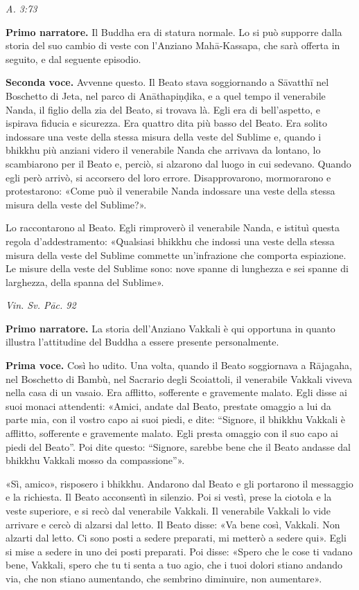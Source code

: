 \emph{A. 3:73}


\textbf{Primo narratore.} Il Buddha era di statura normale. Lo si può supporre
dalla storia del suo cambio di veste con l’Anziano Mahā-Kassapa, che
sarà offerta in seguito, e dal seguente episodio.


\textbf{Seconda voce.} Avvenne questo. Il Beato stava soggiornando a Sāvatthī nel
Boschetto di Jeta, nel parco di Anāthapiṇḍika, e a quel tempo il
venerabile Nanda, il figlio della zia del Beato, si trovava là. Egli era
di bell’aspetto, e ispirava fiducia e sicurezza. Era quattro dita più
basso del Beato. Era solito indossare una veste della stessa misura
della veste del Sublime e, quando i bhikkhu più anziani videro il
venerabile Nanda che arrivava da lontano, lo scambiarono per il Beato e,
perciò, si alzarono dal luogo in cui sedevano. Quando egli però arrivò,
si accorsero del loro errore. Disapprovarono, mormorarono e
protestarono: «Come può il venerabile Nanda indossare una veste della
stessa misura della veste del Sublime?».


Lo raccontarono al Beato. Egli rimproverò il venerabile Nanda, e istituì
questa regola d’addestramento: «Qualsiasi bhikkhu che indossi una veste
della stessa misura della veste del Sublime commette un’infrazione che
comporta espiazione. Le misure della veste del Sublime sono: nove spanne
di lunghezza e sei spanne di larghezza, della spanna del Sublime».


\emph{Vin. Sv. Pāc. 92}


\textbf{Primo narratore.} La storia dell’Anziano Vakkali è qui opportuna in
quanto illustra l’attitudine del Buddha a essere presente personalmente.


\textbf{Prima voce.} Così ho udito. Una volta, quando il Beato soggiornava a
Rājagaha, nel Boschetto di Bambù, nel Sacrario degli Scoiattoli, il
venerabile Vakkali viveva nella casa di un vasaio. Era afflitto,
sofferente e gravemente malato. Egli disse ai suoi monaci attendenti:
«Amici, andate dal Beato, prestate omaggio a lui da parte mia, con il
vostro capo ai suoi piedi, e dite: “Signore, il bhikkhu Vakkali è
afflitto, sofferente e gravemente malato. Egli presta omaggio con il suo
capo ai piedi del Beato”. Poi dite questo: “Signore, sarebbe bene che il
Beato andasse dal bhikkhu Vakkali mosso da compassione”».


«Sì, amico», risposero i bhikkhu. Andarono dal Beato e gli portarono il
messaggio e la richiesta. Il Beato acconsentì in silenzio. Poi si vestì,
prese la ciotola e la veste superiore, e si recò dal venerabile Vakkali.
Il venerabile Vakkali lo vide arrivare e cercò di alzarsi dal letto. Il
Beato disse: «Va bene così, Vakkali. Non alzarti dal letto. Ci sono
posti a sedere preparati, mi metterò a sedere qui». Egli si mise a
sedere in uno dei posti preparati. Poi disse: «Spero che le cose ti
vadano bene, Vakkali, spero che tu ti senta a tuo agio, che i tuoi
dolori stiano andando via, che non stiano aumentando, che sembrino
diminuire, non aumentare».


